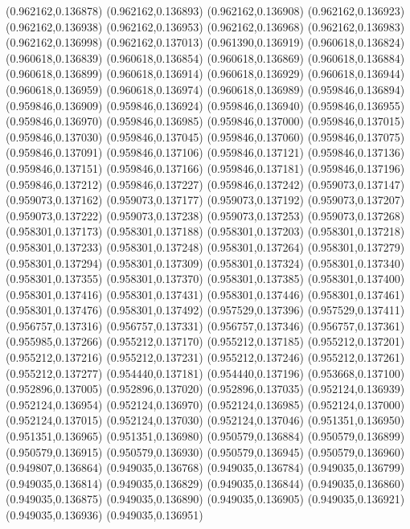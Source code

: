 (0.962162,0.136878)
(0.962162,0.136893)
(0.962162,0.136908)
(0.962162,0.136923)
(0.962162,0.136938)
(0.962162,0.136953)
(0.962162,0.136968)
(0.962162,0.136983)
(0.962162,0.136998)
(0.962162,0.137013)
(0.961390,0.136919)
(0.960618,0.136824)
(0.960618,0.136839)
(0.960618,0.136854)
(0.960618,0.136869)
(0.960618,0.136884)
(0.960618,0.136899)
(0.960618,0.136914)
(0.960618,0.136929)
(0.960618,0.136944)
(0.960618,0.136959)
(0.960618,0.136974)
(0.960618,0.136989)
(0.959846,0.136894)
(0.959846,0.136909)
(0.959846,0.136924)
(0.959846,0.136940)
(0.959846,0.136955)
(0.959846,0.136970)
(0.959846,0.136985)
(0.959846,0.137000)
(0.959846,0.137015)
(0.959846,0.137030)
(0.959846,0.137045)
(0.959846,0.137060)
(0.959846,0.137075)
(0.959846,0.137091)
(0.959846,0.137106)
(0.959846,0.137121)
(0.959846,0.137136)
(0.959846,0.137151)
(0.959846,0.137166)
(0.959846,0.137181)
(0.959846,0.137196)
(0.959846,0.137212)
(0.959846,0.137227)
(0.959846,0.137242)
(0.959073,0.137147)
(0.959073,0.137162)
(0.959073,0.137177)
(0.959073,0.137192)
(0.959073,0.137207)
(0.959073,0.137222)
(0.959073,0.137238)
(0.959073,0.137253)
(0.959073,0.137268)
(0.958301,0.137173)
(0.958301,0.137188)
(0.958301,0.137203)
(0.958301,0.137218)
(0.958301,0.137233)
(0.958301,0.137248)
(0.958301,0.137264)
(0.958301,0.137279)
(0.958301,0.137294)
(0.958301,0.137309)
(0.958301,0.137324)
(0.958301,0.137340)
(0.958301,0.137355)
(0.958301,0.137370)
(0.958301,0.137385)
(0.958301,0.137400)
(0.958301,0.137416)
(0.958301,0.137431)
(0.958301,0.137446)
(0.958301,0.137461)
(0.958301,0.137476)
(0.958301,0.137492)
(0.957529,0.137396)
(0.957529,0.137411)
(0.956757,0.137316)
(0.956757,0.137331)
(0.956757,0.137346)
(0.956757,0.137361)
(0.955985,0.137266)
(0.955212,0.137170)
(0.955212,0.137185)
(0.955212,0.137201)
(0.955212,0.137216)
(0.955212,0.137231)
(0.955212,0.137246)
(0.955212,0.137261)
(0.955212,0.137277)
(0.954440,0.137181)
(0.954440,0.137196)
(0.953668,0.137100)
(0.952896,0.137005)
(0.952896,0.137020)
(0.952896,0.137035)
(0.952124,0.136939)
(0.952124,0.136954)
(0.952124,0.136970)
(0.952124,0.136985)
(0.952124,0.137000)
(0.952124,0.137015)
(0.952124,0.137030)
(0.952124,0.137046)
(0.951351,0.136950)
(0.951351,0.136965)
(0.951351,0.136980)
(0.950579,0.136884)
(0.950579,0.136899)
(0.950579,0.136915)
(0.950579,0.136930)
(0.950579,0.136945)
(0.950579,0.136960)
(0.949807,0.136864)
(0.949035,0.136768)
(0.949035,0.136784)
(0.949035,0.136799)
(0.949035,0.136814)
(0.949035,0.136829)
(0.949035,0.136844)
(0.949035,0.136860)
(0.949035,0.136875)
(0.949035,0.136890)
(0.949035,0.136905)
(0.949035,0.136921)
(0.949035,0.136936)
(0.949035,0.136951)

